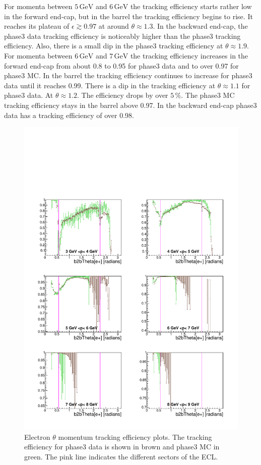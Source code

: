 \documentclass[a4paper,11pt,twosided,final,german,openbib,pdftex,listof=totoc,bibliography=totoc]{scrbook}
\begin{document}
For momenta between $5\,\textrm{GeV}$ and $6\,\textrm{GeV}$ the tracking efficiency starts rather low in the forward end-cap, but in the barrel the tracking efficiency begins to rise. It reaches its plateau of $\epsilon \gtrsim 0.97$ at around $\theta \approx 1.3$. In the backward end-cap, the phase3 data tracking efficiency is noticeably higher than the phase3 tracking efficiency. Also, there is a small dip in the phase3 tracking efficiency at $\theta \approx 1.9$. 
For momenta between $6\,\textrm{GeV}$ and $7\,\textrm{GeV}$ the tracking efficiency increases in the forward end-cap from  about 0.8 to 0.95 for phase3 data and to over 0.97 for phase3 MC. In the barrel the tracking efficiency continues to increase for phase3 data until it reaches 0.99. There is a dip in the tracking efficiency at $\theta \approx 1.1$ for phase3 data. At $\theta \approx 1.2$. The efficiency drops by over $5\,\%$. The phase3 MC tracking efficiency stays in the barrel above 0.97. In the backward end-cap phase3 data has a tracking efficiency of over 0.98.



\begin{figure}[!htbp]
	\centering
	\includegraphics[width=\textwidth]{Plots/master3/xPMThetaemP3}
	\caption[Momentum $\theta$ Electron Efficiency Phase3]{Electron $\theta$ momentum tracking efficiency plots. The tracking efficiency for phase3 data is shown in brown and phase3 MC in green. The pink line indicates the different sectors of the ECL.}
	
	\label{plt:xPMThetaem3}
\end{figure}
\end{document}
